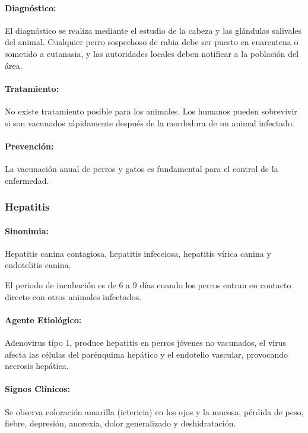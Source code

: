             \paragraph{Diagnóstico:} El diagnóstico se realiza mediante el estudio de la cabeza y las glándulas salivales del animal. Cualquier perro sospechoso de rabia debe ser puesto en cuarentena o sometido a eutanasia, y las autoridades locales deben notificar a la población del área.

            \paragraph{Tratamiento:} No existe tratamiento posible para los animales. Los humanos pueden sobrevivir si son vacunados rápidamente después de la mordedura de un animal infectado.

            \paragraph{Prevención:} La vacunación anual de perros y gatos es fundamental para el control de la enfermedad. 

        \subsubsection{Hepatitis}

            \paragraph{Sinonimia:} Hepatitis canina contagiosa, hepatitis infecciosa, hepatitis vírica canina y endotelitis canina.

            El periodo de incubación es de 6 a 9 días cuando los perros entran en contacto directo con otros animales infectados.

            \paragraph{Agente Etiológico:} Adenovirus tipo 1, produce hepatitis en perros jóvenes no vacunados, el virus afecta las células del parénquima hepático y el endotelio vascular, provocando necrosis hepática.

            \paragraph{Signos Clínicos:} Se observa coloración amarilla (ictericia) en los ojos y la mucosa, pérdida de peso, fiebre, depresión, anorexia, dolor generalizado y deshidratación.

